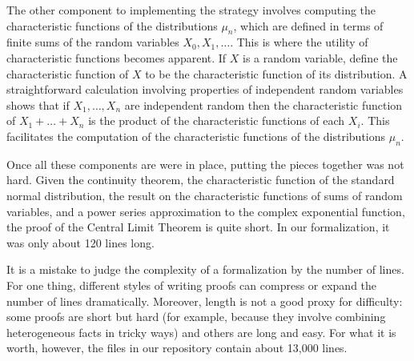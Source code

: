 \documentclass{article}
\begin{document}
The other component to implementing the strategy involves computing the characteristic functions of the distributions $\mu_n$, which are defined in terms of finite sums of the random variables $X_0, X_1, \ldots$. This is where the utility of characteristic functions becomes apparent. If $X$ is a random variable, define the characteristic function of $X$ to be the characteristic function of its distribution. A straightforward calculation involving properties of independent random variables shows that if $X_1, \ldots, X_n$ are independent random then the characteristic function of $X_1 + \ldots + X_n$ is the product of the characteristic functions of each $X_i$. This facilitates the computation of the characteristic functions of the distributions $\mu_n$. 

Once all these components are were in place, putting the pieces together was not hard. Given the continuity theorem, the characteristic function of the standard normal distribution, the result on the characteristic functions of sums of random variables, and a power series approximation to the complex exponential function, the proof of the Central Limit Theorem is quite short. In our formalization, it was only about 120 lines long. 

It is a mistake to judge the complexity of a formalization by the number of lines. For one thing, different styles of writing proofs can compress or expand the number of lines dramatically. Moreover, length is not a good proxy for difficulty: some proofs are short but hard (for example, because they involve combining heterogeneous facts in tricky ways) and others are long and easy. For what it is worth, however, the files in our repository contain about 13,000 lines.



\end{document}
